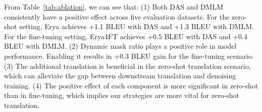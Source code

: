 \begin{table}[htbp]
\caption{\textbf{Ablation analysis on Erya benchmark using the BLEU metric.}}
\label{tab:ablation}
\centering
\small
{}
\end{table}


From Table~\ref{tab:ablation}, we can see that: 
(1) Both DAS and DMLM consistently have a positive effect across five evaluation datasets. For the zero-shot setting, Erya achieves +1.1 BLEU with DAS and +1.3 BLEU with DMLM. %
For the fine-tuning setting, Erya4FT achieves +0.5 BLEU with DAS and +0.4 BLEU with DMLM. 
(2) Dynamic mask ratio plays a positive role in model performance. Enabling it results in +0.3 BLEU gain for the fine-tuning scenario. 
(3) The additional translation is beneficial in the zero-shot translation scenario, which can alleviate the gap between downstream translation and denoising training.
(4) The positive effect of each component is more significant in zero-shot than in fine-tuning, which implies our strategies are more vital for zero-shot translation. 

